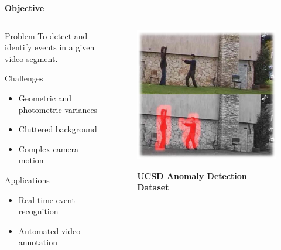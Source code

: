\begin{frame}{\textbf{Objective}}
	\begin{columns}
		\begin{column}{0.55\textwidth}
		\begin{varblock}[\textwidth]{Problem}
			To detect and identify events in a given video segment.
		\end{varblock}
		\begin{varblock}[\textwidth]{Challenges}
			\begin{itemize}
				\item Geometric and photometric variances
				\item Cluttered	 background 
				\item Complex camera motion
			\end{itemize}
		\end{varblock}
		\begin{varblock}[\textwidth]{Applications}
			\begin{itemize}
				\item Real time event recognition
				\item Automated video annotation
			\end{itemize}
		\end{varblock}
		\end{column}
		\begin{column}{0.38\textwidth}
		\begin{figure}
			\centering
			\includegraphics[width=\textwidth]{./img/example.png} 
			 \begin{scriptsize} \begin{center}
		 	\textbf{UCSD Anomaly Detection Dataset \footnotemark}
			\end{center} \end{scriptsize} 	
		\end{figure}
		\end{column}
	\end{columns}
\end{frame}


